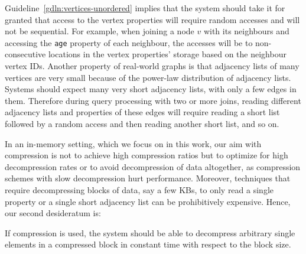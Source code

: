 \begin{guideline}
\label{gdln:fast-decompress}
Guideline~\ref{gdln:vertices-unordered} implies that the system should take it for granted that access to the vertex properties will require random accesses and will not be sequential. For example, when joining a node $v$ with its neighbours and accessing the \texttt{age} property of each neighbour, the accesses will be to non-consecutive locations in the vertex properties' storage based on the neighbour vertex IDs. Another property of real-world graphs is that adjacency lists of many vertices are very small because of the power-law distribution of adjacency lists. Systems should expect many very short adjacency lists, with only a few edges in them. Therefore during query processing with two or more joins, reading different adjacency lists and properties of these edges will require reading a short list followed by a random access and then reading another short list, and so on.

In an in-memory setting, which we focus on in this work, our aim with compression is not to achieve high compression ratios but to optimize for high decompression rates or to avoid decompression of data altogether, as compression schemes with slow decompression hurt performance. Moreover, techniques that require decompressing blocks of data, say a few KBs, to only read a single property or a single short adjacency list can be prohibitively expensive. Hence, our second desideratum is:
\begin{desideratum}
\label{des:compression}
If compression is used, the system should be able to decompress arbitrary single elements in a compressed block in constant time with respect to the block size.
\end{desideratum}  

\end{guideline}

